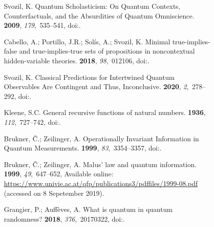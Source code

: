 \documentclass[entropy,article,accept,oneauthor,pdftex]{Definitions/mdpi}
\begin{document}
\begin{figure}[H]
\begin{thebibliography}{999}
Svozil, K.
\newblock Quantum Scholasticism: On Quantum Contexts, Counterfactuals, and the
  Absurdities of Quantum Omniscience.
 {\bf 2009}, {\em 179},~535--541, doi:{\href{https://doi.org/10.1016/j.ins.2008.06.012}{}}.

Cabello, A.; Portillo, J.R.; Sol\'{i}s, A.; Svozil, K.
\newblock Minimal true-implies-false and true-implies-true sets of propositions
  in noncontextual hidden-variable theories.
 {\bf 2018}, {\em 98},~012106, doi:{\href{https://doi.org/10.1103/PhysRevA.98.012106}{}}.

Svozil, K.
\newblock Classical Predictions for Intertwined Quantum Observables Are
  Contingent and Thus, Inconclusive.
 {\bf 2020}, {\em 2},~278--292, doi:{\href{https://doi.org/10.3390/quantum2020018}{}}.

Kleene, S.C.
\newblock General recursive functions of natural numbers.
 {\bf 1936}, {\em 112},~727--742, doi:{\href{https://doi.org/10.1007/BF01565439}{}}.

Brukner, {\v{C}}.; Zeilinger, A.
\newblock Operationally Invariant Information in Quantum Measurements.
 {\bf 1999}, {\em 83},~3354--3357, doi:{\href{https://doi.org/10.1103/PhysRevLett.83.3354}{}}.

Brukner, {\v{C}}.; Zeilinger, A.
\newblock Malus' law and quantum information.
 {\bf 1999}, {\em 49},~647--652, Available online: \url{https://www.univie.ac.at/qfp/publications3/pdffiles/1999-08.pdf} (accessed on 8 Sepetember 2019).

Grangier, P.; Auff{\`{e}}ves, A.
\newblock What is quantum in quantum randomness?
 {\bf 2018}, {\em 376},~20170322,
  doi:{\href{https://doi.org/10.1098/rsta.2017.0322}{}}.


\end{thebibliography}
\end{figure}
\end{document}
